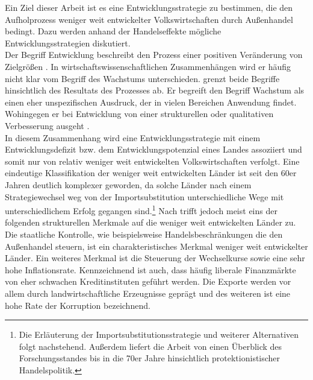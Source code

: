 Ein Ziel dieser Arbeit ist es eine Entwicklungsstrategie zu bestimmen, die den Aufholprozess weniger weit entwickelter Volkswirtschaften durch Au{\ss}enhandel bedingt. Dazu werden anhand der Handelseffekte m{\"o}gliche Entwicklungsstrategien diskutiert. \\
Der Begriff Entwicklung beschreibt den Prozess einer positiven Ver{\"a}nderung von Zielgr{\"o}{\ss}en \citep[Kapitel 1]{Wagner.1995}. In wirtschaftswissenschaftlichen Zusammenh{\"a}ngen wird er h{\"a}ufig nicht klar vom Begriff des Wachstums unterschieden. \citet{Findlay.1984} grenzt beide Begriffe hinsichtlich des Resultats des Prozesses ab. Er begreift den Begriff Wachstum als einen eher unspezifischen Ausdruck, der in vielen Bereichen Anwendung findet. Wohingegen er bei Entwicklung von einer strukturellen oder qualitativen Verbesserung ausgeht \citep{Findlay.1984}.\\
In diesem Zusammenhang wird eine Entwicklungsstrategie mit einem Entwicklungsdefizit bzw. dem Entwicklungspotenzial eines Landes assoziiert und somit nur von relativ weniger weit entwickelten Volkswirtschaften verfolgt. Eine eindeutige Klassifikation der weniger weit entwickelten L{\"a}nder ist seit den 60er Jahren deutlich komplexer geworden, da solche L{\"a}nder nach einem Strategiewechsel weg von der Importsubstitution unterschiedliche Wege mit unterschiedlichem Erfolg gegangen sind.\footnote{Die Erl{\"a}uterung der Importsubstitutionsstrategie und weiterer Alternativen folgt nachstehend. Au{\ss}erdem liefert die Arbeit von \citet{Stern.1973} einen {\"U}berblick des Forschungsstandes bis in die 70er Jahre hinsichtlich protektionistischer Handelspolitik.} Nach \citet{Krugman.2015} trifft jedoch meist eins der folgenden strukturellen Merkmale auf die weniger weit entwickelten L{\"a}nder zu. Die staatliche Kontrolle, wie beispielsweise Handelsbeschr{\"a}nkungen die den Au{\ss}enhandel steuern, ist ein charakteristisches Merkmal weniger weit entwickelter L{\"a}nder. Ein weiteres Merkmal ist die Steuerung der Wechselkurse sowie eine sehr hohe Inflationsrate. Kennzeichnend ist auch, dass h{\"a}ufig liberale Finanzm{\"a}rkte von eher schwachen Kreditinstituten gef{\"u}hrt werden. Die Exporte werden vor allem durch landwirtschaftliche Erzeugnisse gepr{\"a}gt und des weiteren ist eine hohe Rate der Korruption bezeichnend.\newline
